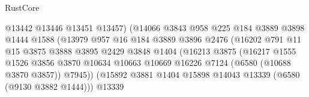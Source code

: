 \begin{lexlean}{RustCore}
\begin{coremodule}
                                        @13442
                                        @13446
                                        @13451
                                        @13457)
                                      (@14066
                                        @3843
                                        @958
                                        @225
                                        @184
                                        @3889
                                        @3898
                                        @1444
                                        @1588
                                        (@13979
                                          @957
                                          @16
                                          @184
                                          @3889
                                          @3896
                                          @2476
                                          (@16202
                                            @791
                                            @11
                                            @15
                                            @3875
                                            @3888
                                            @3895
                                            @2429
                                            @3848
                                            @1404
                                            (@16213
                                              @3875
                                              (@16217
                                                @1555
                                                @1526
                                                @3856
                                                @3870
                                                @10634
                                                @10663
                                                @10669
                                                @16226
                                                @7124
                                                (@6580 (@10688 @3870 @3857))
                                                @7945))
                                            (@15892
                                              @3881
                                              @1404
                                              @15898
                                              @14043
                                              @13339
                                              (@6580 (@9130 @3882 @1444)))
                                            @13339

\end{coremodule}
\end{lexlean}
